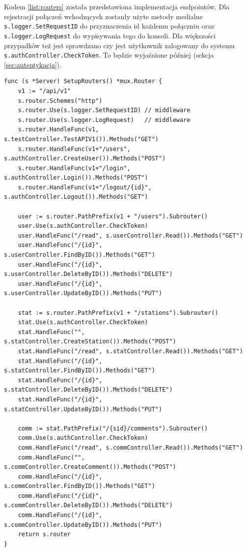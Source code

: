 Kodem \ref{list:routers} została przedstawiona implementacja endpointów.
Dla rejestracji połączeń wchodzących zostanły użyte metody medialne \texttt{s.logger.SetRequestID} do przyznaczenia id każdemu połączniu oraz \texttt{s.logger.LogRequest} do wypisywania tego do konsoli.
Dla większości przypadków też jest sprawdzano czy jest użytkownik zalogowany do systemu \texttt{s.authController.CheckToken}. To będzie wyjaśnione później (sekcja \ref{sec:autentykacja}).
\begin{lstlisting}[label=list:routers,caption=Implementacja punktów końcowych,basicstyle=\tiny\ttfamily]
func (s *Server) SetupRouters() *mux.Router {
	v1 := "/api/v1"
	s.router.Schemes("http")
	s.router.Use(s.logger.SetRequestID) // middleware
	s.router.Use(s.logger.LogRequest)   // middleware
	s.router.HandleFunc(v1, s.testController.TestAPIV1()).Methods("GET")
	s.router.HandleFunc(v1+"/users", s.authController.CreateUser()).Methods("POST")
	s.router.HandleFunc(v1+"/login", s.authController.Login()).Methods("POST")
	s.router.HandleFunc(v1+"/logout/{id}", s.authController.Logout()).Methods("GET")

	user := s.router.PathPrefix(v1 + "/users").Subrouter()
	user.Use(s.authController.CheckToken)
	user.HandleFunc("/read", s.userController.Read()).Methods("GET")
	user.HandleFunc("/{id}", s.userController.FindByID()).Methods("GET")
	user.HandleFunc("/{id}", s.userController.DeleteByID()).Methods("DELETE")
	user.HandleFunc("/{id}", s.userController.UpdateByID()).Methods("PUT")

	stat := s.router.PathPrefix(v1 + "/stations").Subrouter()
	stat.Use(s.authController.CheckToken)
	stat.HandleFunc("", s.statController.CreateStation()).Methods("POST")
	stat.HandleFunc("/read", s.statController.Read()).Methods("GET")
	stat.HandleFunc("/{id}", s.statController.FindByID()).Methods("GET")
	stat.HandleFunc("/{id}", s.statController.DeleteByID()).Methods("DELETE")
	stat.HandleFunc("/{id}", s.statController.UpdateByID()).Methods("PUT")

	comm := stat.PathPrefix("/{sid}/comments").Subrouter()
	comm.Use(s.authController.CheckToken)
	comm.HandleFunc("/read", s.commController.Read()).Methods("GET")
	comm.HandleFunc("", s.commController.CreateComment()).Methods("POST")
	comm.HandleFunc("/{id}", s.commController.FindByID()).Methods("GET")
	comm.HandleFunc("/{id}", s.commController.DeleteByID()).Methods("DELETE")
	comm.HandleFunc("/{id}", s.commController.UpdateByID()).Methods("PUT")
	return s.router
}
\end{lstlisting}

